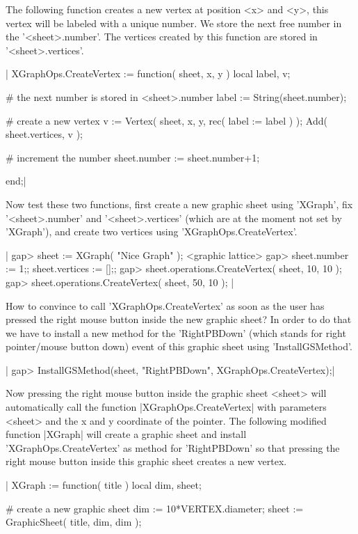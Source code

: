 The following function creates a new vertex at position <x> and <y>, this
vertex  will be labeled with  a  unique number.   We  store the next free
number in  the '<sheet>.number'.  The vertices   created by this function
are stored in '<sheet>.vertices'.

|    XGraphOps.CreateVertex := function( sheet, x, y )
        local   label,  v;

        # the next number is stored in <sheet>.number
        label := String(sheet.number);

        # create a new vertex
        v := Vertex( sheet, x, y, rec( label := label ) );
        Add( sheet.vertices, v );

        # increment the number
        sheet.number := sheet.number+1;

    end;|

Now test these  two functions,  first create a  new graphic  sheet  using
'XGraph', fix '<sheet>.number' and  '<sheet>.vertices' (which are at  the
moment    not  set by   'XGraph'),   and    create  two  vertices   using
'XGraphOps.CreateVertex'.

|    gap> sheet := XGraph( "Nice Graph" );
    <graphic lattice>
    gap> sheet.number := 1;;  sheet.vertices := [];;
    gap> sheet.operations.CreateVertex( sheet, 10, 10 );
    gap> sheet.operations.CreateVertex( sheet, 50, 10 ); |

How to  convince {\GAP} to  call 'XGraphOps.CreateVertex'  as soon as the
user has pressed the right mouse button inside the new graphic sheet?  In
order to  do that we have  to install a new  method for the 'RightPBDown'
(which stands for right pointer/mouse  button down) event of this graphic
sheet using 'InstallGSMethod'.


|    gap> InstallGSMethod(sheet, "RightPBDown", XGraphOps.CreateVertex);|

Now pressing the right mouse button inside the graphic sheet <sheet> will
automatically call the  function |XGraphOps.CreateVertex| with parameters
<sheet> and  the  x  and  y coordinate  of  the  pointer.   The following
modified  function |XGraph|  will   create a  graphic sheet  and  install
'XGraphOps.CreateVertex' as method for 'RightPBDown' so that pressing the
right mouse button inside this graphic sheet creates a new vertex.

|    XGraph := function( title )
        local   dim,  sheet;

        # create a new graphic sheet
        dim   := 10*VERTEX.diameter;
        sheet := GraphicSheet( title, dim, dim );

